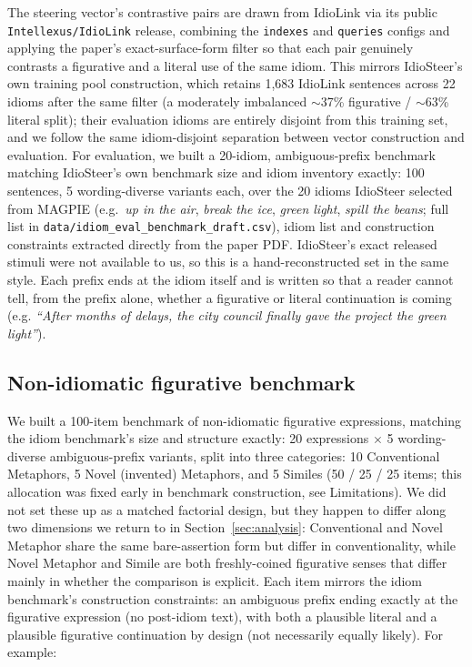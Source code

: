 \documentclass[11pt]{article}
\begin{document}
The steering vector's contrastive pairs are drawn from IdioLink \citep{idiolink} via its
public \texttt{Intellexus/IdioLink} release, combining the \texttt{indexes} and
\texttt{queries} configs and applying the paper's exact-surface-form filter so that each
pair genuinely contrasts a figurative and a literal use of the same idiom. This mirrors
IdioSteer's own training pool construction, which retains 1{,}683 IdioLink sentences
across 22 idioms after the same filter (a moderately imbalanced $\sim$37\% figurative /
$\sim$63\% literal split); their evaluation idioms are entirely disjoint from this
training set, and we follow the same idiom-disjoint separation between vector
construction and evaluation. For evaluation, we built a 20-idiom, ambiguous-prefix
benchmark matching IdioSteer's own benchmark size and idiom inventory exactly: 100
sentences, 5 wording-diverse variants each, over the 20 idioms IdioSteer selected from
MAGPIE \citep{magpie} (e.g.\ \emph{up in the air}, \emph{break the ice}, \emph{green
light}, \emph{spill the beans}; full list in
\texttt{data/idiom\_eval\_benchmark\_draft.csv}), idiom list and construction constraints
extracted directly from the paper PDF. IdioSteer's exact released stimuli were not
available to us, so this is a hand-reconstructed set in the same style. Each prefix ends
at the idiom itself and is
written so that a reader cannot tell, from the prefix alone, whether a figurative or
literal continuation is coming (e.g. \emph{``After months of delays, the city council
finally gave the project the green light''}).

\subsection{Non-idiomatic figurative benchmark}
\label{sec:fig-data}

We built a 100-item benchmark of non-idiomatic figurative expressions, matching the idiom
benchmark's size and structure exactly: 20 expressions $\times$ 5 wording-diverse
ambiguous-prefix variants, split into three categories: 10 Conventional Metaphors, 5
Novel (invented) Metaphors, and 5 Similes (50 / 25 / 25 items; this allocation was fixed
early in benchmark construction, see Limitations). We did not set these up as a matched
factorial design, but they happen to differ along two dimensions we return to in
Section~\ref{sec:analysis}: Conventional and Novel Metaphor share the same bare-assertion
form but differ in conventionality, while Novel Metaphor and Simile are both
freshly-coined figurative senses that differ mainly in whether the comparison is
explicit. Each item mirrors the idiom benchmark's construction constraints: an ambiguous
prefix ending exactly at the figurative expression (no post-idiom text), with both a
plausible literal and a plausible figurative continuation by design (not necessarily
equally likely). For example:
\end{document}
